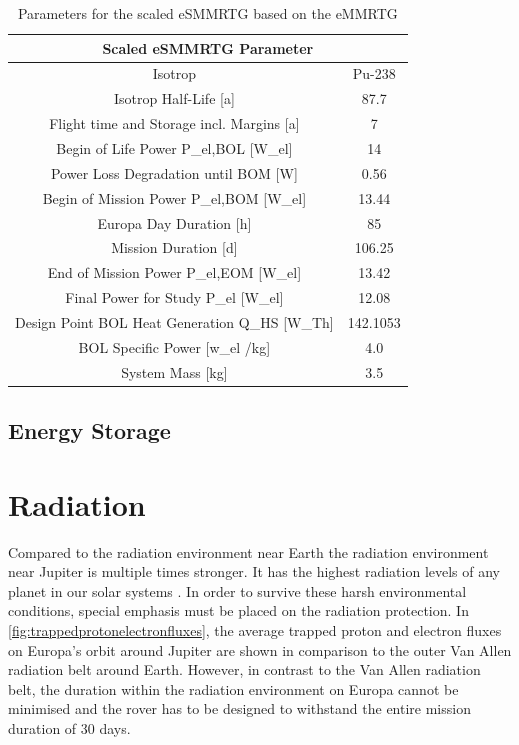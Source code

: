 \begin{table}[H]
\centering
\begin{tabular}{|c|c|}
\hline
\multicolumn{2}{|c|}{Scaled eSMMRTG Parameter}                \\ \hline
Isotrop                                            & Pu-238   \\ \hline
Isotrop Half-Life {[}a{]}                          & 87.7     \\ \hline
Flight time and Storage incl. Margins  {[}a{]}     & 7        \\ \hline
Begin of Life Power P\_el,BOL {[}W\_el{]}          & 14       \\ \hline
Power Loss Degradation until BOM {[}W{]}           & 0.56     \\ \hline
Begin of Mission Power P\_el,BOM {[}W\_el{]}       & 13.44    \\ \hline
Europa Day Duration {[}h{]}                        & 85       \\ \hline
Mission Duration {[}d{]}                           & 106.25   \\ \hline
End of Mission Power P\_el,EOM {[}W\_el{]}         & 13.42    \\ \hline
Final Power for Study P\_el {[}W\_el{]}            & 12.08    \\ \hline
Design Point BOL Heat Generation Q\_HS {[}W\_Th{]} & 142.1053 \\ \hline
BOL Specific Power {[}w\_el /kg{]}                 & 4.0      \\ \hline
System Mass {[}kg{]}                               & 3.5      \\ \hline
\end{tabular}
\caption{Parameters for the scaled eSMMRTG based on the eMMRTG}
\label{tab:esmmrtg}
\end{table}


\subsection{Energy Storage} 



\clearpage

\section{Radiation}
\label{sec:Radiation}

Compared to the radiation environment near Earth the radiation environment near Jupiter is multiple times stronger. It has the highest radiation levels of any planet in our solar systems \cite{Platzhalter}. In order to survive these harsh environmental conditions, special emphasis must be placed on the radiation protection. In \autoref{fig:trappedprotonelectronfluxes}, the average trapped proton and electron fluxes on Europa's orbit around Jupiter are shown in comparison to the outer Van Allen radiation belt around Earth. However, in contrast to the Van Allen radiation belt, the duration within the radiation environment on Europa cannot be minimised and the rover has to be designed to withstand the entire mission duration of 30 days.

